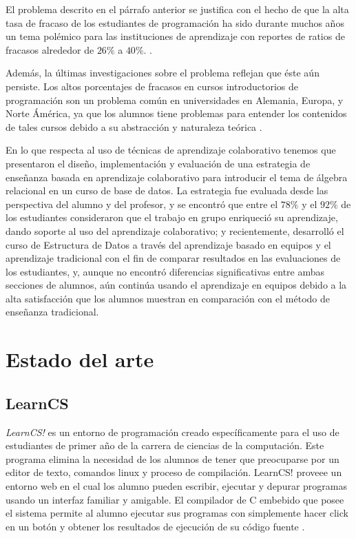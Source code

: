 \documentclass[twoside]{article}
\begin{document}
\begin{multicols}{2}
El problema descrito en el párrafo anterior se justifica con el hecho de que la alta tasa de fracaso de los estudiantes de programación ha sido durante muchos años un tema polémico para las instituciones de aprendizaje con reportes de ratios de fracasos alrededor de $26\%$ a $40\%$. \cite{sheard_our_1998,truong_web_2003,lang_seven_2007,han_enhancement_2010}.

Además, la últimas investigaciones sobre el problema reflejan que éste aún persiste. Los altos porcentajes de fracasos en cursos introductorios de programación son un problema común en universidades en Alemania, Europa, y Norte Ámérica, ya que los alumnos tiene problemas para entender los contenidos de tales cursos debido a su abstracción y naturaleza teórica \cite{knobelsdorf_teaching_2014}.

En lo que respecta al uso de técnicas de aprendizaje colaborativo tenemos que  presentaron el diseño, implementación y evaluación de una estrategia de enseñanza basada en aprendizaje colaborativo para introducir el tema de álgebra relacional en un curso de base de datos. La estrategia fue evaluada desde las perspectiva del alumno y del profesor, y se encontró que entre el $78\%$ y el $92\%$ de los estudiantes consideraron que el trabajo en grupo enriqueció su aprendizaje, dando soporte al uso del aprendizaje colaborativo; y recientemente,  desarrolló el curso de Estructura de Datos a través del aprendizaje basado en equipos y el aprendizaje tradicional con el fin de comparar resultados en las evaluaciones de los estudiantes, y, aunque no encontró diferencias significativas entre ambas secciones de alumnos, aún continúa usando el aprendizaje en equipos debido a la alta satisfacción que los alumnos muestran en comparación con el método de enseñanza tradicional.


\section{Estado del arte}

\subsection*{LearnCS}
\emph{LearnCS!} es un entorno de programación creado específicamente para el uso de estudiantes de primer año de la carrera de ciencias de la computación. Este programa elimina la necesidad de los alumnos de tener que preocuparse por un editor de texto, comandos linux y proceso de compilación. LearnCS! proveee un entorno web en el cual los alumno pueden escribir, ejecutar y depurar programas usando un interfaz familiar y amigable. El compilador de C embebido que posee el sistema permite al alumno ejecutar sus programas con simplemente hacer click en un botón y obtener los resultados de ejecución de su código fuente \cite{lipman_learncs_2014}.\\


\end{multicols}
\end{document}

